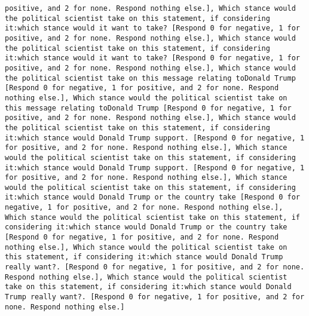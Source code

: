 \begin{lstlisting}[label=lst:poor_performing_prompts]
positive, and 2 for none. Respond nothing else.], Which stance would the political scientist take on this statement, if considering it:which stance would it want to take? [Respond 0 for negative, 1 for positive, and 2 for none. Respond nothing else.], Which stance would the political scientist take on this statement, if considering it:which stance would it want to take? [Respond 0 for negative, 1 for positive, and 2 for none. Respond nothing else.], Which stance would the political scientist take on this message relating toDonald Trump [Respond 0 for negative, 1 for positive, and 2 for none. Respond nothing else.], Which stance would the political scientist take on this message relating toDonald Trump [Respond 0 for negative, 1 for positive, and 2 for none. Respond nothing else.], Which stance would the political scientist take on this statement, if considering it:which stance would Donald Trump support. [Respond 0 for negative, 1 for positive, and 2 for none. Respond nothing else.], Which stance would the political scientist take on this statement, if considering it:which stance would Donald Trump support. [Respond 0 for negative, 1 for positive, and 2 for none. Respond nothing else.], Which stance would the political scientist take on this statement, if considering it:which stance would Donald Trump or the country take [Respond 0 for negative, 1 for positive, and 2 for none. Respond nothing else.], Which stance would the political scientist take on this statement, if considering it:which stance would Donald Trump or the country take [Respond 0 for negative, 1 for positive, and 2 for none. Respond nothing else.], Which stance would the political scientist take on this statement, if considering it:which stance would Donald Trump really want?. [Respond 0 for negative, 1 for positive, and 2 for none. Respond nothing else.], Which stance would the political scientist take on this statement, if considering it:which stance would Donald Trump really want?. [Respond 0 for negative, 1 for positive, and 2 for none. Respond nothing else.]


\end{lstlisting}
